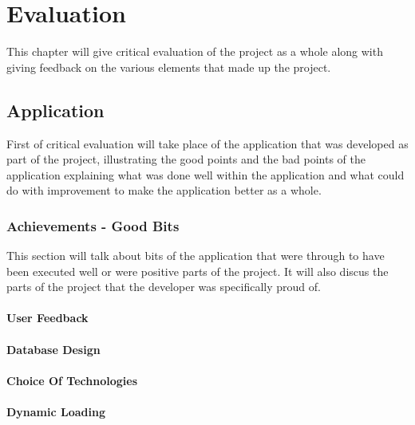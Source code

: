 \chapter{Evaluation}

This chapter will give critical evaluation of the project as a whole along with giving feedback on the various elements that made up the project.

\section{Application}

First of critical evaluation will take place of the application that was developed as part of the project, illustrating the good points and the bad points of the application explaining what was done well within the application and what could do with improvement to make the application better as a whole.

\subsection{Achievements - Good Bits}

This section will talk about bits of the application that were through to have been executed well or were positive parts of the project. It will also discus the parts of the project that the developer was specifically proud of.

\subsubsection{User Feedback}


\subsubsection{Database Design}

\subsubsection{Choice Of Technologies}

\subsubsection{Dynamic Loading}

